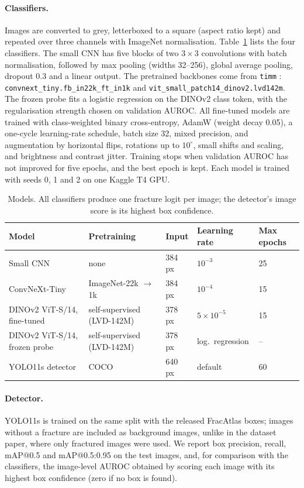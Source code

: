 \documentclass[11pt,a4paper]{article}
\newcommand{\code}[1]{\texttt{#1}}
\begin{document}
\paragraph{Classifiers.} Images are converted to grey, letterboxed to a square (aspect ratio kept) and repeated over
three channels with ImageNet normalisation. Table~\ref{tab:setup} lists the four classifiers. The small CNN has five
blocks of two $3\times3$ convolutions with batch normalisation, followed by max pooling (widths 32--256), global
average pooling, dropout 0.3 and a linear output. The pretrained backbones come from \code{timm}
\citep{wightman2019timm}: \code{convnext\_tiny.fb\_in22k\_ft\_in1k} and \code{vit\_small\_patch14\_dinov2.lvd142m}.
The frozen probe fits a logistic regression on the DINOv2 class token, with the regularisation strength chosen on
validation AUROC. All fine-tuned models are trained with class-weighted binary cross-entropy, AdamW
\citep{loshchilov2019adamw} (weight decay 0.05), a one-cycle learning-rate schedule, batch size 32, mixed precision,
and augmentation by horizontal flips, rotations up to $10^\circ$, small shifts and scaling, and brightness and
contrast jitter. Training stops when validation AUROC has not improved for five epochs, and the best epoch is kept.
Each model is trained with seeds 0, 1 and 2 on one Kaggle T4 GPU.

\begin{table}[t]
\centering
\caption{Models. All classifiers produce one fracture logit per image; the detector's image score is its highest box
confidence.}
\label{tab:setup}
\small
\begin{tabular}{lllll}
\toprule
Model & Pretraining & Input & Learning rate & Max epochs \\
\midrule
Small CNN & none & 384 px & $10^{-3}$ & 25 \\
ConvNeXt-Tiny & ImageNet-22k $\rightarrow$ 1k & 384 px & $10^{-4}$ & 15 \\
DINOv2 ViT-S/14, fine-tuned & self-supervised (LVD-142M) & 378 px & $5\times10^{-5}$ & 15 \\
DINOv2 ViT-S/14, frozen probe & self-supervised (LVD-142M) & 378 px & log.\ regression & -- \\
YOLO11s detector & COCO & 640 px & default & 60 \\
\bottomrule
\end{tabular}
\end{table}

\paragraph{Detector.} YOLO11s \citep{jocher2024yolo11} is trained on the same split with the released FracAtlas boxes;
images without a fracture are included as background images, unlike in the dataset paper, where only fractured
images were used. We report box precision, recall, mAP@0.5 and mAP@0.5:0.95 on the test images, and, for comparison
with the classifiers, the image-level AUROC obtained by scoring each image with its highest box confidence (zero if
no box is found).
\end{document}
